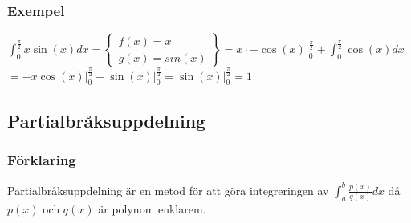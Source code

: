\documentclass{article}
\begin{document}
\subsubsection{Exempel}
${\displaystyle \int_{0}^{\frac{\pi}{2}}x\sin(x)dx=\left\{\begin{array}{l}
   f(x)=x   \\
   g(x)=sin(x)
\end{array}
\right\} = x \cdot-\cos(x)\bigg\vert_{0}^{\frac{\pi}{2}} + \int_{0}^{\frac{\pi}{2}}\cos(x)dx}$ \\
$= -x\cos(x)\bigg\vert_{0}^{\frac{\pi}{2}} + \sin(x)\bigg\vert_{0}^{\frac{\pi}{2}} = \sin(x)\bigg\vert_{0}^{\frac{\pi}{2}}=1$

\subsection{Partialbråksuppdelning}
\subsubsection{Förklaring}
Partialbråksuppdelning är en metod för att göra integreringen av ${\displaystyle\int_{a}^{b}\frac{p(x)}{q(x)}dx }$ då $p(x)$ och $q(x)$ är polynom enklarem.
\end{document}
